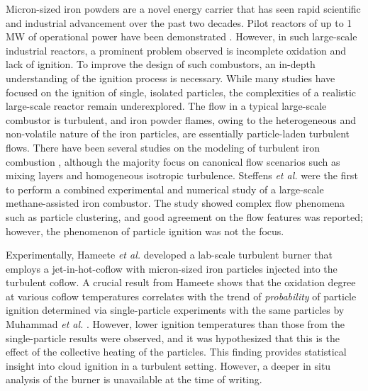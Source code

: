 \documentclass[twocolumn,9pt]{article} %
\begin{document}
Micron-sized iron powders are a novel energy carrier that has seen rapid scientific and industrial advancement over the past two decades. Pilot reactors of up to 1 MW of operational power have been demonstrated \cite{niekvanrooijthesis, van20260}. However, in such large-scale industrial reactors, a prominent problem observed is incomplete oxidation and lack of ignition. To improve the design of such combustors, an in-depth understanding of the ignition process is necessary. While many studies \cite{chang2026experimental,cen2025detailed, Ning2024,Abdallah_2024} have focused on the ignition of single, isolated particles, the complexities of a realistic large-scale reactor remain underexplored. The flow in a typical large-scale combustor is turbulent, and iron powder flames, owing to the heterogeneous and non-volatile nature of the iron particles, are essentially particle-laden turbulent flows. There have been several studies on the modeling of turbulent iron combustion \cite{Hemamalini2024,Luu2024,Thaeter2024,thater2026interaction,steffens2025exploring}, although the majority focus on canonical flow scenarios such as mixing layers and homogeneous isotropic turbulence. Steffens \emph{et al.} \cite{steffens2025exploring} were the first to perform a combined experimental and numerical study of a large-scale methane-assisted iron combustor. The study showed complex flow phenomena such as particle clustering, and good agreement on the flow features was reported; however, the phenomenon of particle ignition was not the focus.

Experimentally, Hameete \emph{et al.} \cite{hameete2024aerosol} developed a lab-scale turbulent burner that employs a jet-in-hot-coflow with micron-sized iron particles injected into the turbulent coflow. A crucial result from Hameete \cite{hameetethesis} shows that the oxidation degree at various coflow temperatures correlates with the trend of \textit{probability} of particle ignition determined via single-particle experiments with the same particles by Muhammad \emph{et al.} \cite{Abdallah_2024}. However, lower ignition temperatures than those from the single-particle results were observed, and it was hypothesized that this is the effect of the collective heating of the particles. This finding provides statistical insight into cloud ignition in a turbulent setting. However, a deeper in situ analysis of the burner is unavailable at the time of writing. 
\end{document}
